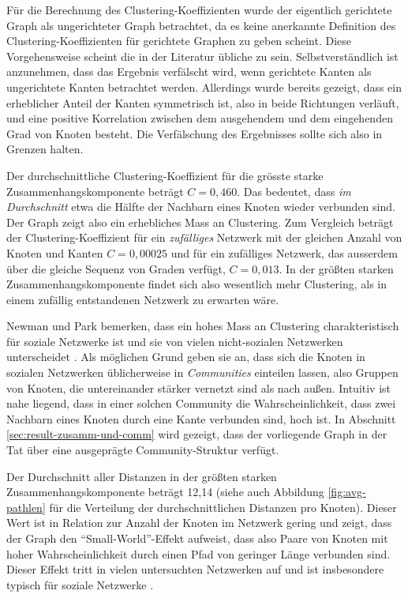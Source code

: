 Für die Berechnung des Clustering-Koeffizienten wurde der eigentlich
gerichtete Graph als ungerichteter Graph betrachtet, da es keine
anerkannte Definition des Clustering-Koeffizienten für gerichtete
Graphen zu geben scheint. Diese Vorgehensweise scheint die in der
Literatur übliche zu sein. Selbstverständlich ist anzunehmen, dass
das Ergebnis verfälscht wird, wenn gerichtete Kanten als
ungerichtete Kanten betrachtet werden. Allerdings wurde bereits
gezeigt, dass ein erheblicher Anteil der Kanten symmetrisch ist, also
in beide Richtungen verläuft, und eine positive Korrelation zwischen
dem ausgehendem und dem eingehenden Grad von Knoten besteht. Die
Verf\"alschung des Ergebnisses
sollte sich also in Grenzen halten.

Der durchschnittliche Clustering-Koeffizient für die grösste
starke Zusammenhangskomponente beträgt $C = 0,460$. Das bedeutet,
dass \emph{im Durchschnitt} etwa die Hälfte der Nachbarn eines
Knoten wieder verbunden sind. Der Graph zeigt also ein erhebliches
Mass an Clustering. Zum Vergleich beträgt der Clustering-Koeffizient
für ein \emph{zufälliges} Netzwerk mit der gleichen Anzahl von
Knoten und Kanten $C = 0,00025$ und für ein zufälliges Netzwerk,
das ausserdem über die gleiche Sequenz von Graden verfügt, $C =
0,013$. In der größten starken Zusammenhangskomponente findet sich
also wesentlich mehr Clustering, als in einem zufällig entstandenen
Netzwerk zu erwarten wäre.

Newman und Park bemerken, dass ein hohes Mass an Clustering
charakteristisch für soziale Netzwerke ist und sie von vielen
nicht-sozialen Netzwerken unterscheidet \cite{PhysRevE.68.036122}. Als
möglichen Grund geben sie an, dass sich die Knoten in sozialen
Netzwerken üblicherweise in \emph{Communities} einteilen lassen,
also Gruppen von Knoten, die untereinander stärker vernetzt sind als
nach außen. Intuitiv ist nahe liegend, dass in einer solchen Community
die Wahrscheinlichkeit, dass zwei Nachbarn eines Knoten durch eine
Kante verbunden sind, hoch ist. In Abschnitt
\ref{sec:result-zusamm-und-comm} wird gezeigt, dass der vorliegende
Graph in der Tat über eine ausgepr\"agte Community-Struktur verfügt.

Der Durchschnitt aller Distanzen in der größten starken
Zusammenhangskomponente beträgt 12,14 (siehe auch Abbildung
\ref{fig:avg-pathlen} für die Verteilung der durchschnittlichen
Distanzen pro Knoten). Dieser Wert ist in Relation zur Anzahl der
Knoten im Netzwerk gering und zeigt, dass der Graph den
"`Small-World"'-Effekt aufweist, dass also Paare von Knoten mit
hoher Wahrscheinlichkeit durch einen Pfad von geringer Länge
verbunden sind. Dieser Effekt tritt in vielen untersuchten Netzwerken
auf und ist insbesondere typisch für soziale Netzwerke
\cite{newman:167}.

